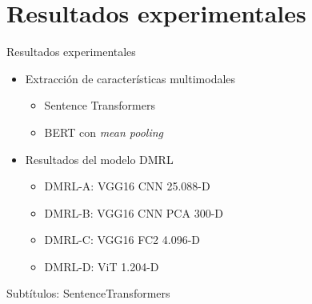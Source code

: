 \documentclass{beamer}
\begin{document}
\section{Resultados experimentales}

\begin{frame}{Resultados experimentales}
\begin{itemize}
\item Extracción de características multimodales
\pause
    \begin{itemize}
        \item Sentence Transformers
        \pause
        \item BERT con \textit{mean pooling}
    \end{itemize}
\pause
\vspace{0.5cm}
\item Resultados del modelo DMRL
\pause
    \begin{itemize}
        \item DMRL-A: VGG16 CNN 25.088-D
        \pause
        \item DMRL-B: VGG16 CNN PCA 300-D
        \pause
        \item DMRL-C: VGG16 FC2 4.096-D
        \pause
        \item DMRL-D: ViT 1.204-D
    \end{itemize}
\end{itemize}
\end{frame}

\begin{frame}{Subtítulos: SentenceTransformers}
    \begin{table}[t]{}
        \centering
    \end{table}
\end{frame}
\end{document}
